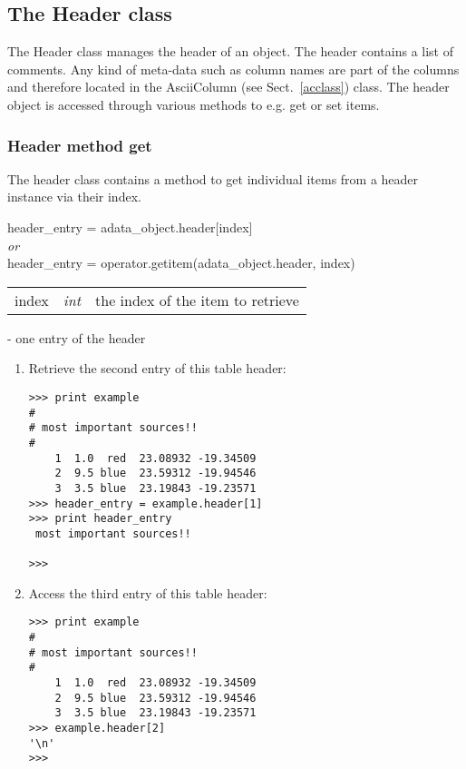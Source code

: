 %
%
\subsection{The Header class}
\label{hclass}
The Header class manages the header of an \ad object.
The header contains a list of comments.
Any kind of meta-data such as column names are part of the
columns and therefore located in the AsciiColumn (see Sect.\ \ref{acclass})
class. The header object is accessed through various
methods to e.g. get or set items.

\subsubsection{Header method get}
\label{ahe_get}
%
The header class contains a method to get individual items from a header
instance via their index.

header\_entry = adata\_object.header[index]\\
{\it or}\\
header\_entry = operator.getitem(adata\_object.header, index)

\begin{tabular}{lcl}
index &{\it int}& the index of the item to retrieve\\
\end{tabular}

- one entry of the header

\begin{enumerate}
\item Retrieve the second entry of this table header:
\begin{small}
\begin{verbatim}
>>> print example
#
# most important sources!!
#
    1  1.0  red  23.08932 -19.34509
    2  9.5 blue  23.59312 -19.94546
    3  3.5 blue  23.19843 -19.23571
>>> header_entry = example.header[1]
>>> print header_entry
 most important sources!!

>>>
\end{verbatim}
\end{small}
\item Access the third entry of this table header:
\begin{small}
\begin{verbatim}
>>> print example
#
# most important sources!!
#
    1  1.0  red  23.08932 -19.34509
    2  9.5 blue  23.59312 -19.94546
    3  3.5 blue  23.19843 -19.23571
>>> example.header[2]
'\n'
>>>
\end{verbatim}
\end{small}
\end{enumerate}


